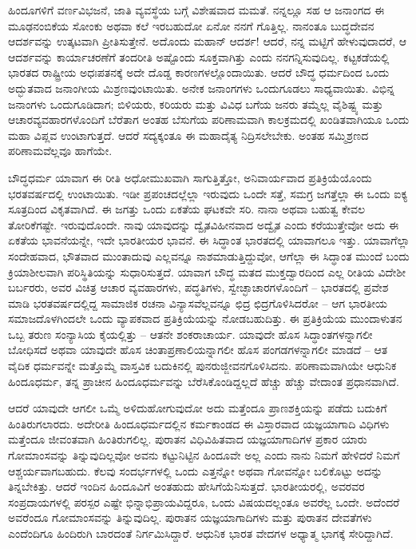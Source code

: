 ಹಿಂದೂಗಳಿಗೆ ವರ್ಣವಿಭಜನೆ, ಜಾತಿ ವ್ಯವಸ್ಥೆಯ ಬಗ್ಗೆ ವಿಶೇಷವಾದ ಮಮತೆ. ನನ್ನಲ್ಲೂ ಸಹ ಆ ಜನಾಂಗದ ಈ ಮೂಢನಂಬಿಕೆಯ ಸೋಂಕು ಅಥವಾ ಕಲೆ ಇರಬಹುದೋ ಏನೋ ನನಗೆ ಗೊತ್ತಿಲ್ಲ. ನಾನಂತೂ ಬುದ್ಧದೇವನ ಆದರ್ಶವನ್ನು ಉತ್ಕಟವಾಗಿ ಪ್ರೀತಿಸುತ್ತೇನೆ. ಅದೊಂದು ಮಹಾನ್ ಆದರ್ಶ! ಆದರೆ, ನನ್ನ ಮಟ್ಟಿಗೆ ಹೇಳುವುದಾದರೆ, ಆ ಆದರ್ಶವನ್ನು ಕಾರ್ಯಾಚರಣೆಗೆ ತಂದರೀತಿ ಅಷ್ಟೊಂದು ಸೂಕ್ತವಾಗಿತ್ತು ಎಂದು ನನಗನ್ನಿಸುವುದಿಲ್ಲ. ಕಟ್ಟಕಡೆಯಲ್ಲಿ ಭಾರತದ ರಾಷ್ಟ್ರೀಯ ಅಧಃಪತನಕ್ಕೆ ಅದೇ ದೊಡ್ಡ ಕಾರಣಗಳಲ್ಲೊಂದಾಯಿತು. ಆದರೆ ಬೌದ್ಧ ಧರ್ಮದಿಂದ ಒಂದು ಅದ್ಭುತವಾದ ಜನಾಂಗೀಯ ಮಿಶ್ರಣವುಂಟಾಯಿತು. ಅನೇಕ ಜನಾಂಗಗಳು ಒಂದುಗೂಡಲು ಸಾಧ್ಯವಾಯಿತು. ವಿಭಿನ್ನ ಜನಾಂಗಳು ಒಂದುಗೂಡಿದಾಗ; ಬಿಳಿಯರು, ಕರಿಯರು ಮತ್ತು ವಿವಿಧ ಬಗೆಯ ಜನರು ತಮ್ಮೆಲ್ಲ ವೈಶಿಷ್ಟ್ಯ ಮತ್ತು ಆಚಾರವ್ಯವಹಾರಗಳೊಂದಿಗೆ ಬೆರೆತಾಗ ಅಂತಹ ಬೆಸುಗೆಯ ಪರಿಣಾಮವಾಗಿ ಕಾಲಕ್ರಮದಲ್ಲಿ ಖಂಡಿತವಾಗಿಯೂ ಒಂದು ಮಹಾ ವಿಪ್ಲವ ಉಂಟಾಗುತ್ತದೆ. ಆದರೆ ಸದ್ಯಕ್ಕಂತೂ ಈ ಮಹಾದೈತ್ಯ ನಿದ್ರಿಸಲೇಬೇಕು. ಅಂತಹ ಸಮ್ಮಿಶ್ರಣದ ಪರಿಣಾಮವೆಲ್ಲವೂ ಹಾಗೆಯೇ.

ಬೌದ್ಧಧರ್ಮ ಯಾವಾಗ ಈ ರೀತಿ ಅಧೋಮುಖವಾಗಿ ಸಾಗುತ್ತಿತ್ತೋ, ಅನಿವಾರ್ಯವಾದ ಪ್ರತಿಕ್ರಿಯೆಯೊಂದು ಭರತವರ್ಷದಲ್ಲಿ ಉಂಟಾಯಿತು. ಇಡೀ ಪ್ರಪಂಚದಲ್ಲೆಲ್ಲಾ ಇರುವುದು ಒಂದೇ ಸತ್ತೆ, ಸಮಗ್ರ ಜಗತ್ತೆಲ್ಲಾ ಈ ಒಂದು ಐಕ್ಯ ಸೂತ್ರದಿಂದ ವಿಕೃತವಾಗಿದೆ. ಈ ಜಗತ್ತು ಒಂದು ಏಕತೆಯ ಘಟಕವೇ ಸರಿ. ನಾನಾ ಅಥವಾ ಬಹುತ್ವ ಕೇವಲ ತೋರಿಕೆಗಷ್ಟೇ. ಇರುವುದೊಂದೇ. ನಾವು ಯಾವುದನ್ನು ದ್ವೈತವಿಹೀನವಾದ ಅದ್ವೈತ ಎಂದು ಕರೆಯುತ್ತೇವೋ ಅದು ಈ ಏಕತೆಯ ಭಾವನೆಯನ್ನೇ, ಇದೇ ಭಾರತೀಯರ ಭಾವನೆ. ಈ ಸಿದ್ಧಾಂತ ಭಾರತದಲ್ಲಿ ಯಾವಾಗಲೂ ಇತ್ತು. ಯಾವಾಗೆಲ್ಲಾ ಸಂದೇಹವಾದ, ಭೌತವಾದ ಮುಂತಾದುವು ಎಲ್ಲವನ್ನೂ ನಾಶಮಾಡುತ್ತಿದ್ದುವೋ, ಆಗೆಲ್ಲಾ ಈ ಸಿದ್ಧಾಂತ ಮುಂದೆ ಬಂದು ಕ್ರಿಯಾಶೀಲವಾಗಿ ಪರಿಸ್ಥಿತಿಯನ್ನು ಸುಧಾರಿಸುತ್ತದೆ. ಯಾವಾಗ ಬೌದ್ಧ ಮತದ ಮುಕ್ತದ್ವಾರದಿಂದ ಎಲ್ಲ ರೀತಿಯ ವಿದೇಶೀ ಬರ್ಬರರು, ಅವರ ವಿಚಿತ್ರ ಆಚಾರ ವ್ಯವಹಾರಗಳು, ಪದ್ಧತಿಗಳು, ಸ್ವೇಚ್ಛಾಚಾರಗಳೊಂದಿಗೆ – ಭಾರತದಲ್ಲಿ ಪ್ರವೇಶ ಮಾಡಿ ಭರತವರ್ಷದಲ್ಲಿದ್ದ ಸಾಮಾಜಿಕ ರಚನಾ ವಿನ್ಯಾಸವೆಲ್ಲವನ್ನೂ ಛಿದ್ರ ಛಿದ್ರಗೊಳಿಸಿದರೋ – ಆಗ ಭಾರತೀಯ ಸಮಾಜದೊಳಗಿಂದಲೇ ಒಂದು ವ್ಯಾಪಕವಾದ ಪ್ರತಿಕ್ರಿಯೆಯನ್ನು ನೋಡಬಹುದಿತ್ತು. ಈ ಪ್ರತಿಕ್ರಿಯೆಯ ಮುಂದಾಳುತನ ಒಬ್ಬ ತರುಣ ಸಂನ್ಯಾಸಿಯ ಕೈಯಲ್ಲಿತ್ತು – ಆತನೇ ಶಂಕರಾಚಾರ್ಯ. ಯಾವುದೇ ಹೊಸ ಸಿದ್ಧಾಂತಗಳನ್ನಾಗಲೀ ಬೋಧಿಸದೆ ಅಥವಾ ಯಾವುದೇ ಹೊಸ ಚಿಂತಾಪ್ರಣಾಲಿಯನ್ನಾಗಲೀ ಹೊಸ ಪಂಗಡಗಳನ್ನಾಗಲೀ ಮಾಡದೆ – ಆತ ವೈದಿಕ ಧರ್ಮವನ್ನೇ ಮತ್ತೊಮ್ಮೆ ವಾಸ್ತವಿಕ ಬದುಕಿನಲ್ಲಿ ಪುನರುಜ್ಜೀವನಗೊಳಿಸಿದನು. ಪರಿಣಾಮವಾಗಿಯೇ ಆಧುನಿಕ ಹಿಂದೂಧರ್ಮ, ತನ್ನ ಪ್ರಾಚೀನ ಹಿಂದೂಧರ್ಮವನ್ನು ಬೆರೆಸಿಕೊಂಡಿದ್ದಲ್ಲದೆ ಹೆಚ್ಚು ಹೆಚ್ಚು ವೇದಾಂತ ಪ್ರಧಾನವಾಗಿದೆ.

ಆದರೆ ಯಾವುದೇ ಆಗಲೀ ಒಮ್ಮೆ ಅಳಿದುಹೋಗುವುದೋ ಅದು ಮತ್ತೆಂದೂ ಪ್ರಾಣಶಕ್ತಿಯನ್ನು ಪಡೆದು ಬದುಕಿಗೆ ಹಿಂತಿರುಗಲಾರದು. ಅದೇರೀತಿ ಹಿಂದೂಧರ್ಮದಲ್ಲಿನ ಕರ್ಮಕಾಂಡದ ಈ ವಿಸ್ತಾರವಾದ ಯಜ್ಞಯಾಗಾದಿ ವಿಧಿಗಳು ಮತ್ತೆಂದೂ ಜೀವಂತವಾಗಿ ಹಿಂತಿರುಗಲಿಲ್ಲ. ಪುರಾತನ ವಿಧಿವಿಹಿತವಾದ ಯಜ್ಞಯಾಗಾದಿಗಳ ಪ್ರಕಾರ ಯಾರು ಗೋಮಾಂಸವನ್ನು ತಿನ್ನುವುದಿಲ್ಲವೋ ಅವನು ಕಟ್ಟುನಿಟ್ಟಿನ ಹಿಂದೂವೇ ಅಲ್ಲ ಎಂದು ನಾನು ನಿಮಗೆ ಹೇಳಿದರೆ ನಿಮಗೆ ಆಶ್ಚರ್ಯವಾಗಬಹುದು. ಕೆಲವು ಸಂದರ್ಭಗಳಲ್ಲಿ ಒಂದು ಎತ್ತನ್ನೋ ಅಥವಾ ಗೋವನ್ನೋ ಬಲಿಕೊಟ್ಟು ಅದನ್ನು ತಿನ್ನಬೇಕಿತ್ತು. ಆದರೆ ಇಂದಿನ ಹಿಂದೂವಿಗೆ ಅಂತಹುದು ಹೇಸಿಗೆಯೆನಿಸುತ್ತದೆ. ಭಾರತೀಯರಲ್ಲಿ, ಅವರವರ ಸಂಪ್ರದಾಯಗಳಲ್ಲಿ ಪರಸ್ಪರ ಎಷ್ಟೇ ಭಿನ್ನಾಭಿಪ್ರಾಯವಿದ್ದರೂ, ಒಂದು ವಿಷಯದಲ್ಲಂತೂ ಅವರೆಲ್ಲ ಒಂದೇ. ಅದೆಂದರೆ ಅವರೆಂದೂ ಗೋಮಾಂಸವನ್ನು ತಿನ್ನುವುದಿಲ್ಲ. ಪುರಾತನ ಯಜ್ಞಯಾಗಾದಿಗಳು ಮತ್ತು ಪುರಾತನ ದೇವತೆಗಳು ಎಂದೆಂದಿಗೂ ಹಿಂದಿರುಗಿ ಬಾರದಂತೆ ನಿರ್ಗಮಿಸಿದ್ದಾರೆ. ಆಧುನಿಕ ಭಾರತ ವೇದಗಳ ಅಧ್ಯಾತ್ಮ ಭಾಗಕ್ಕೆ ಸೇರಿದ್ದಾಗಿದೆ.

